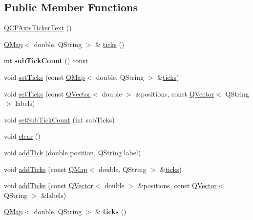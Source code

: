 \subsection*{Public Member Functions}
\begin{DoxyCompactItemize}
\item 
\hyperlink{class_q_c_p_axis_ticker_text_a1d7243b1256c1aa9d1d5b99b2e84e648}{Q\+C\+P\+Axis\+Ticker\+Text} ()
\item 
\hyperlink{class_q_map}{Q\+Map}$<$ double, Q\+String $>$ \& \hyperlink{class_q_c_p_axis_ticker_text_ac84622a6bb4f2a98474e185ecaf3189a}{ticks} ()
\item 
int {\bfseries sub\+Tick\+Count} () const \hypertarget{class_q_c_p_axis_ticker_text_a47eabd2e4218d2cf3aee7c25e743396f}{}\label{class_q_c_p_axis_ticker_text_a47eabd2e4218d2cf3aee7c25e743396f}

\item 
void \hyperlink{class_q_c_p_axis_ticker_text_a8cdf1f21940f1f53f5e3d30b2c74f5cf}{set\+Ticks} (const \hyperlink{class_q_map}{Q\+Map}$<$ double, Q\+String $>$ \&\hyperlink{class_q_c_p_axis_ticker_text_ac84622a6bb4f2a98474e185ecaf3189a}{ticks})
\item 
void \hyperlink{class_q_c_p_axis_ticker_text_a69f3898cc1cf11d2437851f959faa1e8}{set\+Ticks} (const \hyperlink{class_q_vector}{Q\+Vector}$<$ double $>$ \&positions, const \hyperlink{class_q_vector}{Q\+Vector}$<$ Q\+String $>$ labels)
\item 
void \hyperlink{class_q_c_p_axis_ticker_text_a8cfa50c51183c90186892eeef978d571}{set\+Sub\+Tick\+Count} (int sub\+Ticks)
\item 
void \hyperlink{class_q_c_p_axis_ticker_text_a21826d2fcd9a25c194d34d4f67aa1460}{clear} ()
\item 
void \hyperlink{class_q_c_p_axis_ticker_text_aada3db69e5fc6585aaa4ea5d89552eb0}{add\+Tick} (double position, Q\+String label)
\item 
void \hyperlink{class_q_c_p_axis_ticker_text_aba34051300eecaefbedb2df8feff2d45}{add\+Ticks} (const \hyperlink{class_q_map}{Q\+Map}$<$ double, Q\+String $>$ \&\hyperlink{class_q_c_p_axis_ticker_text_ac84622a6bb4f2a98474e185ecaf3189a}{ticks})
\item 
void \hyperlink{class_q_c_p_axis_ticker_text_a8140c730e20b0050e1b702af3db00b2e}{add\+Ticks} (const \hyperlink{class_q_vector}{Q\+Vector}$<$ double $>$ \&positions, const \hyperlink{class_q_vector}{Q\+Vector}$<$ Q\+String $>$ \&labels)
\item 
\hyperlink{class_q_map}{Q\+Map}$<$ double, Q\+String $>$ \& {\bfseries ticks} ()\hypertarget{class_q_c_p_axis_ticker_text_ab820240363a58dd195c000c77657a522}{}\label{class_q_c_p_axis_ticker_text_ab820240363a58dd195c000c77657a522}


\end{DoxyCompactItemize}

